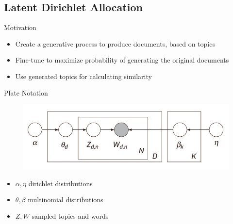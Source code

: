 \subsection{Latent Dirichlet Allocation}
\begin{frame}{\insertsubsection}{Motivation}
	\begin{itemize}
		\item Create a generative process to produce documents, based on topics
		\item Fine-tune to maximize probability of generating the original documents
		\item Use generated topics for calculating similarity
	\end{itemize}
\end{frame}

\begin{frame}{\insertsubsection}{Plate Notation}
	\begin{figure}
		\centering
		\includegraphics[width = 1 \textwidth]{figures/lda_model.jpg}
	\end{figure}
	\begin{itemize}
		\item $\alpha, \eta$ dirichlet distributions
		\item $\theta, \beta$ multinomial distributions
		\item $Z, W$ sampled topics and words
	\end{itemize}
\end{frame}

